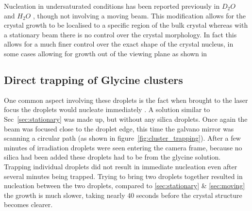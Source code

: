Nucleation in undersaturated conditions has been reported previously in $D_2O$ 
\cite{Rungsimanon2010} and $H_2O$ \cite{Flannigan2023}, though not involving a 
moving beam. This modification allows for the crystal growth to be localised to
a specific region of the bulk crystal whereas with a stationary beam there is no
control over the crystal morphology. In fact this allows for a much finer control
over the exact shape of the crystal nucleus, in some cases allowing for growth out
of the viewing plane as shown in 

\begin{figure}
	\centering
\end{figure}


\subsection{Direct trapping of Glycine clusters}
\label{sec:clusters}
One common aspect involving these droplets is the fact when brought 
to the laser focus the droplets would nucleate immediately 
\cite{Liao2022}. A solution similar to Sec~\ref{sec:stationary} was 
made up, but without any silica droplets. Once again the beam was 
focused close to the droplet edge, this time the galvano mirror was 
scanning a circular path (as shown in figure~\ref{fig:cluster_trapping}). 
After a few minutes of irradiation droplets were seen entering the 
camera frame, because no silica had been added these droplets had 
to be from the glycine solution. Trapping individual droplets did 
not result in immediate nucleation even after several minutes being 
trapped. Trying to bring two droplets together resulted in nucleation 
between the two droplets, compared to \ref{sec:stationary} \& 
\ref{sec:moving} the growth is much slower, taking nearly 40 seconds 
before the crystal structure becomes clearer.
